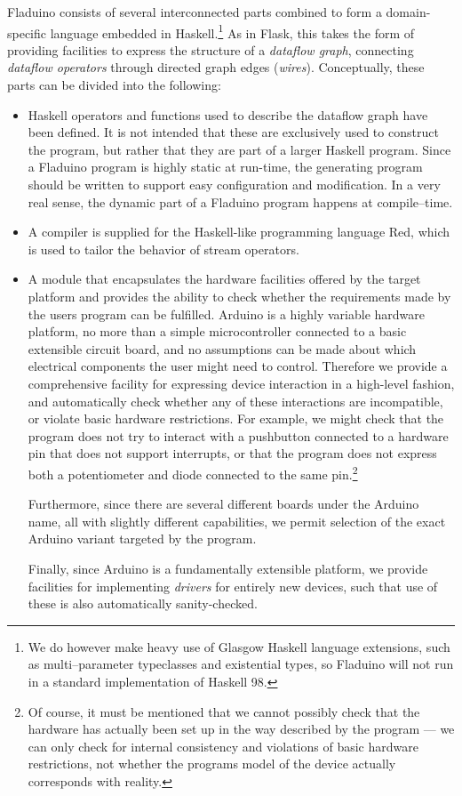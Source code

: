 \documentclass[a4paper, oneside, final]{memoir}
\begin{document}
Fladuino consists of several interconnected parts combined to form a
domain-specific language embedded in Haskell.\footnote{We do however
  make heavy use of Glasgow Haskell language extensions, such as
  multi--parameter typeclasses and existential types, so Fladuino will
  not run in a standard implementation of Haskell 98.}  As in Flask,
this takes the form of providing facilities to express the structure
of a \textit{dataflow graph}, connecting \textit{dataflow operators}
through directed graph edges (\textit{wires}).  Conceptually, these
parts can be divided into the following:

\begin{itemize}
\item Haskell operators and functions used to describe the dataflow
  graph have been defined.  It is not intended that these are
  exclusively used to construct the program, but rather that they are
  part of a larger Haskell program.  Since a Fladuino program is
  highly static at run-time, the generating program should be written
  to support easy configuration and modification.  In a very real
  sense, the dynamic part of a Fladuino program happens at
  compile--time.
\item A compiler is supplied for the Haskell-like programming language
  Red, which is used to tailor the behavior of stream operators.
\item A module that encapsulates the hardware facilities offered by
  the target platform and provides the ability to check whether the
  requirements made by the users program can be fulfilled.  Arduino is
  a highly variable hardware platform, no more than a simple
  microcontroller connected to a basic extensible circuit board, and
  no assumptions can be made about which electrical components the
  user might need to control.  Therefore we provide a comprehensive
  facility for expressing device interaction in a high-level fashion,
  and automatically check whether any of these interactions are
  incompatible, or violate basic hardware restrictions.  For example,
  we might check that the program does not try to interact with a
  pushbutton connected to a hardware pin that does not support
  interrupts, or that the program does not express both a
  potentiometer and diode connected to the same pin.\footnote{Of
    course, it must be mentioned that we cannot possibly check that
    the hardware has actually been set up in the way described by the
    program --- we can only check for internal consistency and
    violations of basic hardware restrictions, not whether the
    programs model of the device actually corresponds with reality.}

  Furthermore, since there are several different boards under the
  Arduino name, all with slightly different capabilities, we permit
  selection of the exact Arduino variant targeted by the program.

  Finally, since Arduino is a fundamentally extensible platform, we
  provide facilities for implementing \textit{drivers} for entirely
  new devices, such that use of these is also automatically
  sanity-checked.
\end{itemize}
\end{document}
